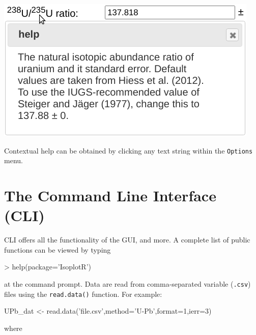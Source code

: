 \begin{refsection}
\noindent\begin{minipage}[t]{.45\textwidth}
\strut\vspace*{-\baselineskip}\newline
\includegraphics[width=\textwidth]{../figures/contextualhelp.png}
\end{minipage}
\begin{minipage}[t]{.55\textwidth}
Contextual help can be obtained by clicking any text string within the
\texttt{Options} menu.
\end{minipage}

\section{The Command Line Interface (CLI)}

CLI offers all the functionality of the GUI, and more. A complete list
of public functions can be viewed by typing

\begin{console}
> help(package='IsoplotR')
\end{console}

\noindent at the command prompt. Data are read from comma-separated
variable (\texttt{.csv}) files using the \texttt{read.data()}
function. For example:

\begin{script}
UPb_dat <- read.data('file.csv',method='U-Pb',format=1,ierr=3)
\end{script}

\noindent where\\


\end{refsection}
